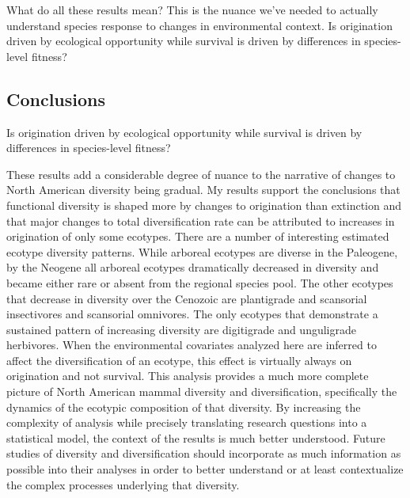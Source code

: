 \documentclass[12pt,letterpaper]{article}
\begin{document}
What do all these results mean? This is the nuance we've needed to actually understand species response to changes in environmental context. Is origination driven by ecological opportunity while survival is driven by differences in species-level fitness?








\subsection*{Conclusions}

Is origination driven by ecological opportunity while survival is driven by differences in species-level fitness?

These results add a considerable degree of nuance to the narrative of changes to North American diversity being gradual. My results support the conclusions that functional diversity is shaped more by changes to origination than extinction and that major changes to total diversification rate can be attributed to increases in origination of only some ecotypes. There are a number of interesting estimated ecotype diversity patterns. While arboreal ecotypes are diverse in the Paleogene, by the Neogene all arboreal ecotypes dramatically decreased in diversity and became either rare or absent from the regional species pool. The other ecotypes that decrease in diversity over the Cenozoic are plantigrade and scansorial insectivores and scansorial omnivores. The only ecotypes that demonstrate a sustained pattern of increasing diversity are digitigrade and unguligrade herbivores. When the environmental covariates analyzed here are inferred to affect the diversification of an ecotype, this effect is virtually always on origination and not survival. This analysis provides a much more complete picture of North American mammal diversity and diversification, specifically the dynamics of the ecotypic composition of that diversity. By increasing the complexity of analysis while precisely translating research questions into a statistical model, the context of the results is much better understood. Future studies of diversity and diversification should incorporate as much information as possible into their analyses in order to better understand or at least contextualize the complex processes underlying that diversity.
\end{document}

